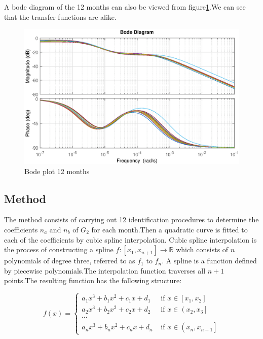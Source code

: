 \documentclass[a4paper,12pt]{report}
\numberwithin{equation}{section}
\begin{document}
A bode diagram of the 12 months can also be viewed from figure\ref{fig;bodeG2}.We can see that the transfer functions are alike.

\begin{figure}[H]
    \includegraphics[width=\textwidth]{Bode_plot_Jan_Dec.eps}
    \centering
    \caption{Bode plot 12 months}
    \label{fig;bodeG2}
\end{figure}


\subsection{Method}
The method consists of carrying out 12 identification procedures to determine the coefficients $n_{a}$ and $n_{b}$ of $G_{2}$ for each month.Then a quadratic curve is fitted to each of the coefficients by cubic spline interpolation. Cubic spline interpolation is the process of constructing a spline $f:\left[x_{1}, x_{n+1}\right] \rightarrow \mathbb{R}$ which consists of $n$ polynomials of degree three, referred to as $f_{1}$ to $f_{n}$. A spline is a function defined by piecewise polynomials.The  interpolation function traverses all $n+1$ points.The resulting function has the following structure:

$$
f(x)= \begin{cases}a_{1} x^{3}+b_{1} x^{2}+c_{1} x+d_{1} & \text { if } x \in\left[x_{1}, x_{2}\right] \\ a_{2} x^{3}+b_{2} x^{2}+c_{2} x+d_{2} & \text { if } x \in\left(x_{2}, x_{3}\right] \\ \cdots & \\ a_{n} x^{3}+b_{n} x^{2}+c_{n} x+d_{n} & \text { if } x \in\left(x_{n}, x_{n+1}\right]\end{cases}
$$
\end{document}
